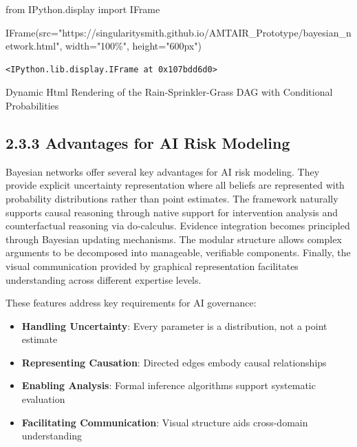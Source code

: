 \documentclass[
  11pt,
  letterpaper,
]{book}
\newenvironment{Shaded}{\begin{snugshade}}{\end{snugshade}}
\newcommand{\ImportTok}[1]{\textcolor[rgb]{0.00,0.46,0.62}{#1}}
\newcommand{\NormalTok}[1]{\textcolor[rgb]{0.00,0.23,0.31}{#1}}
\newcommand{\OperatorTok}[1]{\textcolor[rgb]{0.37,0.37,0.37}{#1}}
\newcommand{\StringTok}[1]{\textcolor[rgb]{0.13,0.47,0.30}{#1}}
\providecommand{\tightlist}{%
  \setlength{\itemsep}{0pt}\setlength{\parskip}{0pt}}
\begin{document}
\begin{Shaded}
\begin{Highlighting}[]
\ImportTok{from}\NormalTok{ IPython.display }\ImportTok{import}\NormalTok{ IFrame}

\NormalTok{IFrame(src}\OperatorTok{=}\StringTok{"https://singularitysmith.github.io/AMTAIR\_Prototype/bayesian\_network.html"}\NormalTok{, width}\OperatorTok{=}\StringTok{"100\%"}\NormalTok{, height}\OperatorTok{=}\StringTok{"600px"}\NormalTok{)}
\end{Highlighting}
\end{Shaded}

\label{rain_sprinkler_grass_example_network_rendering}
\begin{verbatim}
<IPython.lib.display.IFrame at 0x107bdd6d0>
\end{verbatim}

Dynamic Html Rendering of the Rain-Sprinkler-Grass DAG with Conditional
Probabilities

\subsection*{2.3.3 Advantages for AI Risk
Modeling}\label{sec-modeling-advantages}

Bayesian networks offer several key advantages for AI risk modeling.
They provide explicit uncertainty representation where all beliefs are
represented with probability distributions rather than point estimates.
The framework naturally supports causal reasoning through native support
for intervention analysis and counterfactual reasoning via do-calculus.
Evidence integration becomes principled through Bayesian updating
mechanisms. The modular structure allows complex arguments to be
decomposed into manageable, verifiable components. Finally, the visual
communication provided by graphical representation facilitates
understanding across different expertise levels.

These features address key requirements for AI governance:

\begin{itemize}
\tightlist
\item
  \textbf{Handling Uncertainty}: Every parameter is a distribution, not
  a point estimate
\item
  \textbf{Representing Causation}: Directed edges embody causal
  relationships
\item
  \textbf{Enabling Analysis}: Formal inference algorithms support
  systematic evaluation
\item
  \textbf{Facilitating Communication}: Visual structure aids
  cross-domain understanding
\end{itemize}
\end{document}
